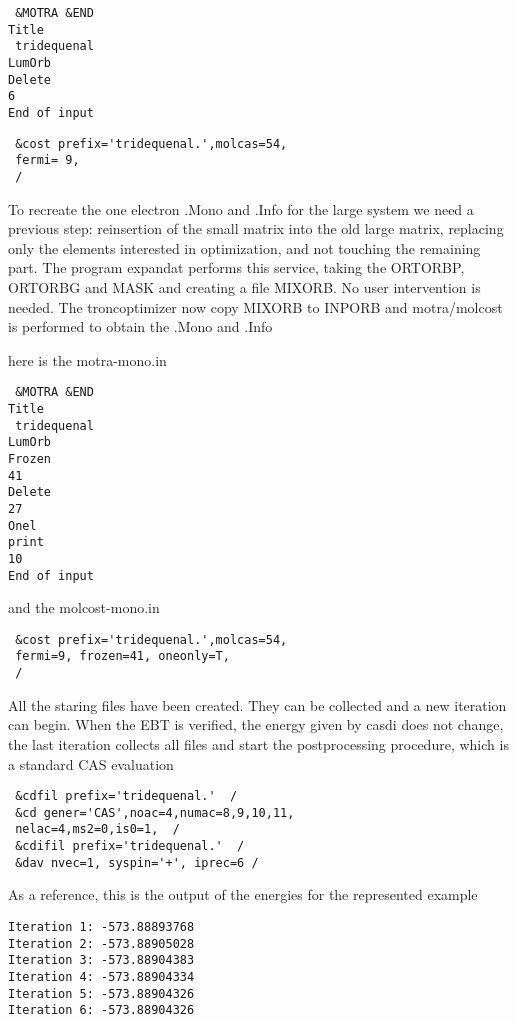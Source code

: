 \documentclass[11pt,a4paper]{article}
\begin{document}
\begin{verbatim}
 &MOTRA &END
Title
 tridequenal
LumOrb
Delete
6
End of input
\end{verbatim}

\begin{verbatim}
 &cost prefix='tridequenal.',molcas=54,
 fermi= 9,
 /
\end{verbatim}

To recreate the one electron .Mono and .Info for the large system we need a
previous step: reinsertion of the small matrix into the old large matrix,
replacing only the elements interested in optimization, and not touching the
remaining part. The program expandat performs this service, taking the
ORTORBP, ORTORBG and MASK and creating a file MIXORB. No user intervention
is needed. The troncoptimizer now copy MIXORB to INPORB and motra/molcost is
performed to obtain the .Mono and .Info

here is the motra-mono.in

\begin{verbatim}
 &MOTRA &END
Title
 tridequenal
LumOrb
Frozen
41
Delete
27
Onel
print
10
End of input
\end{verbatim}

and the molcost-mono.in

\begin{verbatim}
 &cost prefix='tridequenal.',molcas=54,
 fermi=9, frozen=41, oneonly=T,
 /
\end{verbatim}

All the staring files have been created. They can be collected and a new
iteration can begin. When the EBT is verified, the energy given by casdi
does not change, the last iteration collects all files and start the
postprocessing procedure, which is a standard CAS evaluation

\begin{verbatim}
 &cdfil prefix='tridequenal.'  /
 &cd gener='CAS',noac=4,numac=8,9,10,11,
 nelac=4,ms2=0,is0=1,  /
 &cdifil prefix='tridequenal.'  /
 &dav nvec=1, syspin='+', iprec=6 /
\end{verbatim}

As a reference, this is the output of the energies for the represented
example

\begin{verbatim}
Iteration 1: -573.88893768
Iteration 2: -573.88905028
Iteration 3: -573.88904383
Iteration 4: -573.88904334
Iteration 5: -573.88904326
Iteration 6: -573.88904326
\end{verbatim}
\end{document}
